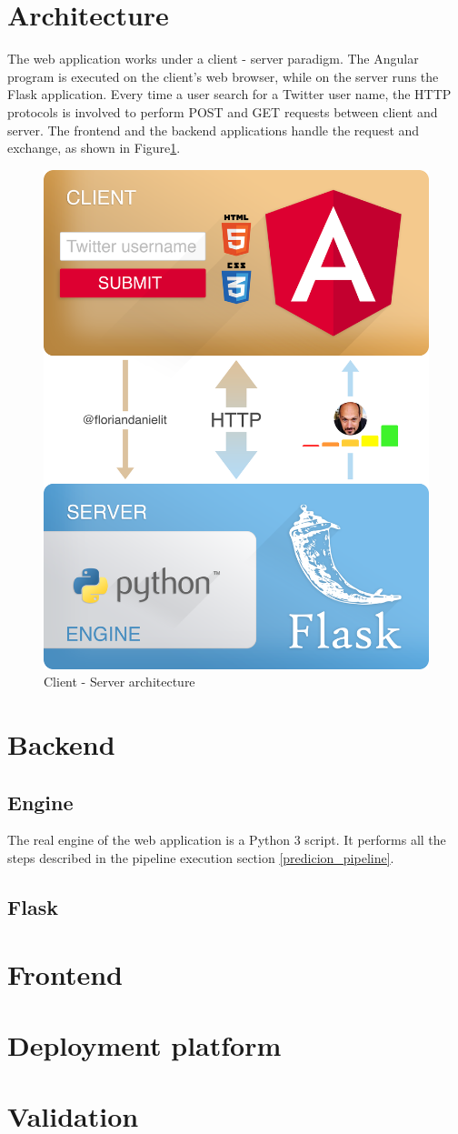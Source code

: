 \section{Architecture}
The web application works under a client - server paradigm. The Angular program is executed on the client's web browser, while on the server runs the Flask application.
Every time a user search for a Twitter user name, the HTTP protocols is involved to perform POST and GET requests between client and server. The frontend and the backend applications handle the request and exchange, as shown in Figure\ref{fig:architecture}.
\begin{figure}
	\begin{center}
		\includegraphics[width=0.6\columnwidth]{chapter6/figure/architecture.png}\par 
	\end{center}
	\caption{Client - Server architecture}
	\label{fig:architecture}
\end{figure}

\section{Backend}
\subsection{Engine}
The real engine of the web application is a Python 3 script. It performs all the steps described in the pipeline execution section \ref{predicion_pipeline}.

\subsection{Flask}
\section{Frontend}
\section{Deployment platform}
\section{Validation}
